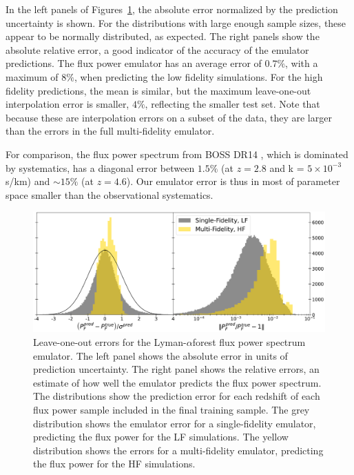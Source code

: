 \documentclass[a4paper,11pt]{article}
\newcommand{\Lya}{Lyman-$\alpha$}
\begin{document}
In the left panels of Figures~\ref{fig:fps_error}, the absolute error normalized by the prediction uncertainty is shown.
For the distributions with large enough sample sizes, these appear to be normally distributed, as expected.
The right panels show the absolute relative error, a good indicator of the accuracy of the emulator predictions.
The flux power emulator has an average error of $0.7\%$, with a maximum of $8\%$, when predicting the low fidelity simulations. For the high fidelity predictions, the mean is similar, but the maximum leave-one-out interpolation error is smaller, $4\%$, reflecting the smaller test set. Note that because these are interpolation errors on a subset of the data, they are larger than the errors in the full multi-fidelity emulator.

For comparison, the flux power spectrum from BOSS DR14 \cite{Chabanier:2019}, which is dominated by systematics, has a diagonal error between $1.5\%$ (at $z=2.8$ and k = $5\times 10^{-3}$ s/km) and $\sim 15\%$ (at $z=4.6$). Our emulator error is thus in most of parameter space smaller than the observational systematics.

\begin{figure}
    \centering
    \includegraphics[width=\textwidth]{figures/fpsemu_errors.pdf}
    \caption{\label{fig:fps_error}
    Leave-one-out errors for the \Lya forest flux power spectrum emulator.
    The left panel shows the absolute error in units of prediction uncertainty.
    The right panel shows the relative errors, an estimate of how well the emulator predicts the flux power spectrum.
    The distributions show the prediction error for each redshift of each flux power sample included in the final training sample.
    The grey distribution shows the emulator error for a single-fidelity emulator, predicting the flux power for the LF simulations.
    The yellow distribution shows the errors for a multi-fidelity emulator, predicting the flux power for the HF simulations.
    }
\end{figure}
\end{document}
